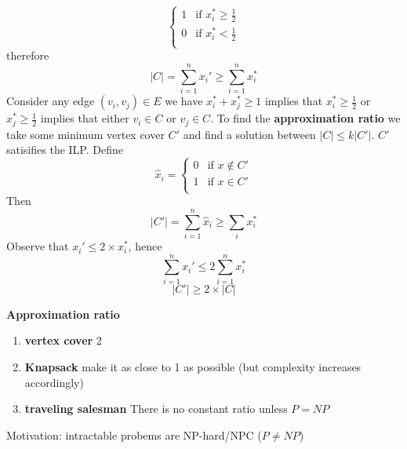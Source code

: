 \documentclass[11pt]{article}
\begin{document}
\begin{example}
\begin{solution}
\[\begin{cases}
                1 & \text{if } x_i^* \geq \frac{1}{2} \\
                0 & \text{if } x_i^* < \frac{1}{2} \\ 
            \end{cases}
        \]
        therefore
        \[
            |C| = \sum_{i=1}^n x_i' \geq \sum_{i=1}^n x_i^*
        \]
        Consider any edge $(v_i, v_j)\in E$ we have $x_i^* + x_j^* \geq 1$ implies that $x_i^* \geq \frac{1}{2}$ or $x_j^* \geq \frac{1}{2}$ implies that either $v_i\in C$ or $v_j\in C$. To find the \textbf{approximation ratio} we take some minimum vertex cover $C'$ and find a solution between $|C| \leq k |C'|$. $C'$ satisifies the ILP. Define 
        \[
            \hat{x}_i = 
            \begin{cases}
                0 & \text{if } x\not\in C' \\
                1 & \text{if } x\in C' \\
            \end{cases}
        \]
        Then 
        \[
            |C'| = \sum_{i = 1}^n \hat{x}_i \geq \sum_{i} x_i^*
        \]
        Observe that $x_i' \leq 2\times x_i^*$, hence
        \[
            \sum_{i=1}^n x_i' \leq 2\sum_{i=1}^n x_i^* 
        \]
        \[
            |C'| \geq 2\times |C|
        \]
    \end{solution}
\end{example}



\begin{defn*}
    \textbf{Approximation ratio} 
    \begin{enumerate}
        \item \textbf{vertex cover} 2
        \item \textbf{Knapsack} make it as close to 1 as possible  (but complexity increases accordingly)
        \item \textbf{traveling salesman} There is no constant ratio unless $P = NP$
    \end{enumerate}
    Motivation: intractable probems are NP-hard/NPC ($P\neq NP$)
\end{defn*}
\end{document}
